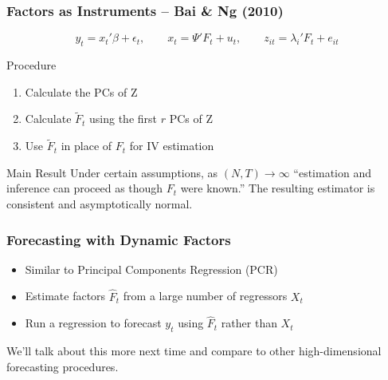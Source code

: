 \documentclass[handout]{beamer}
\begin{document}
\begin{frame}[c]\frametitle{Factors as Instruments -- Bai \& Ng (2010)}

\small

$$\boxed{
	y_t = x_t' \beta + \epsilon_t, \quad \quad
	x_t = \Psi'F_t + u_t, \quad \quad
	z_{it} = \lambda_i' F_t + e_{it}
}$$
\vspace{1em}

\begin{block}
	{Procedure}
	\begin{enumerate}
		\item Calculate the PCs of Z
		\item Calculate $\widetilde{F}_t$ using the first $r$ PCs of Z
		\item Use $\widetilde{F}_t$ in place of $F_t$ for IV estimation
	\end{enumerate}
\end{block}

\begin{block}
	{Main Result}
	Under certain assumptions, as $(N,T) \rightarrow \infty$ ``estimation and inference can proceed as though $F_t$ were known.'' The resulting estimator is consistent and asymptotically normal.
\end{block}

\normalsize

\end{frame}
\begin{frame}[c]\frametitle{Forecasting with Dynamic Factors}
    
 \begin{itemize}
 	\item Similar to Principal Components Regression (PCR)
 	\item Estimate factors $\widehat{F}_t$ from a large number of regressors $X_t$
 	\item Run a regression to forecast $y_t$ using $\widehat{F}_t$ rather than $X_t$ 
 \end{itemize}

\vspace{2em}

\alert{We'll talk about this more next time and compare to other high-dimensional forecasting procedures.}

\end{frame}
\end{document}
